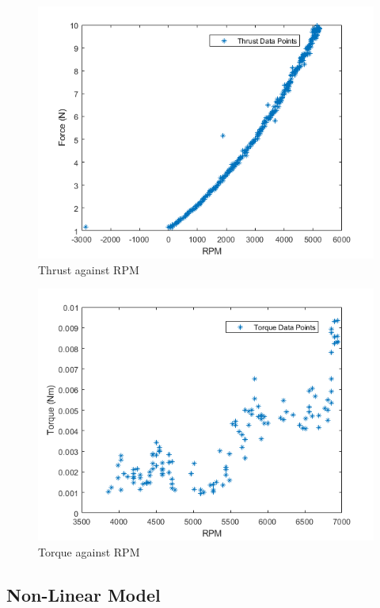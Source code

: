 \documentclass[12pt,a4paper,twoside]{report}
\begin{document}
				\newpage
				
				\begin{figure}[h!]
					\centering
					\includegraphics[width=0.8\linewidth]{ThrustData.png}
					\caption{Thrust against RPM}
					\label{fig:thrustdata}
				\end{figure}
				\begin{figure}[h!]
					\centering
					\includegraphics[width=0.8\linewidth]{TorqueData.png}
					\caption{Torque against RPM}
					\label{fig:torquedata}
				\end{figure}
			
			\newpage
			
			\subsection*{Non-Linear Model}
			
\end{document}

